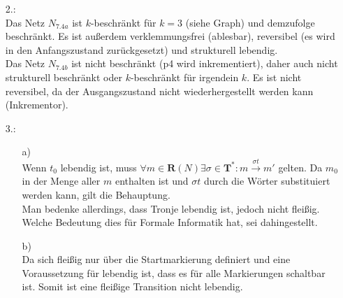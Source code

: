 \documentclass[a4paper,11pt,fleqn]{scrartcl}
\begin{document}
\begin{enumerate}
\begin{enumerate}
			\item[2.:]\quad \\
            	Das Netz $N_{7.4a}$ ist $k$-beschränkt  für $k=3$ (siehe Graph) und demzufolge beschränkt. 
			Es ist außerdem verklemmungsfrei (ablesbar), reversibel (es wird in den Anfangszustand zurückgesetzt)
			und strukturell lebendig.\\
			Das Netz $N_{7.4b}$ ist nicht beschränkt (p4 wird inkrementiert), daher auch nicht strukturell
			beschränkt oder $k$-beschränkt für irgendein $k$. Es ist nicht reversibel, da der Ausgangszustand 
			nicht wiederhergestellt werden kann (Inkrementor).
			\item[3.:]
			\begin{enumerate}
				\item[a)]\quad \\
                Wenn $t_0$ lebendig ist, muss \(\forall m \in \textbf{R}(N)\exists \sigma \in \textbf{T}^*:
					m\overset{\sigma t}{\rightarrow}m'\) gelten. Da $m_0$ in der Menge aller $m$ enthalten ist 
					und \(\sigma t\) durch die Wörter substituiert werden kann, gilt die Behauptung. \\
                    Man bedenke allerdings, dass Tronje lebendig ist, jedoch nicht fleißig. Welche Bedeutung dies für Formale Informatik hat, sei dahingestellt.
				\item[b)]\quad \\
                Da sich fleißig nur über die Startmarkierung definiert und eine Voraussetzung für lebendig 	
					ist, dass es für alle Markierungen schaltbar ist. Somit ist eine fleißige Transition nicht 
					lebendig.
			\end{enumerate}
		\end{enumerate}
	\end{enumerate}
\end{document}
